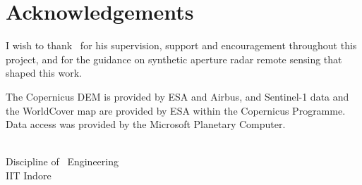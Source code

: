 \chapter*{Acknowledgements}
\thispagestyle{plain}

I wish to thank \btpguide\ for his supervision, support and encouragement throughout this project, and for the
guidance on synthetic aperture radar remote sensing that shaped this work.

The Copernicus DEM is provided by ESA and Airbus, and Sentinel-1 data and the WorldCover map are provided by ESA within
the Copernicus Programme. Data access was provided by the Microsoft Planetary Computer.

\vspace{1.5cm}
\begin{flushright}
\btpstudents\\
Discipline of \btpdiscipline\ Engineering\\
IIT Indore
\end{flushright}
\cleardoublepage
